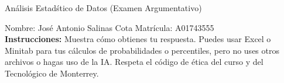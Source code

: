 \documentclass[8pt]{report}
\begin{document}
\newpage



\begin{center}
{An\'alisis Estad\'stico de Datos (Examen Argumentativo)}
\end{center}

Nombre: \underline{\hspace*{.2in}}
José Antonio Salinas Cota
\underline{\hspace*{.2in}} \quad Matr\'icula:\underline{\hspace*{.2in}}
A01743555
\underline{\hspace*{.2in}} \\

{\bf Instrucciones:} Muestra c\'omo obtienes tu respuesta. Puedes usar Excel 
o Minitab para tus cálculos de probabilidades o 
percentiles, pero no uses otros archivos o hagas uso de la IA. Respeta el 
c\'odigo de \'etica del curso y del Tecnol\'ogico 
de Monterrey.
\end{document}
